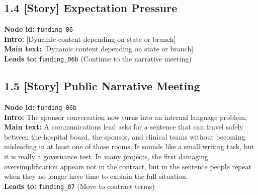 \documentclass[11pt]{article}
\begin{document}
\subsection*{1.4 [Story] Expectation Pressure}
\textbf{Node id:} \texttt{funding\_06}\\
\textbf{Intro:} [Dynamic content depending on state or branch]\\
\textbf{Main text:} [Dynamic content depending on state or branch]\\
\textbf{Leads to:} \texttt{funding\_06b} (Continue to the narrative meeting)\\
\subsection*{1.5 [Story] Public Narrative Meeting}
\textbf{Node id:} \texttt{funding\_06b}\\
\textbf{Intro:} The sponsor conversation now turns into an internal language problem.\\
\textbf{Main text:} A communications lead asks for a sentence that can travel safely between the hospital board, the sponsor, and clinical teams without becoming misleading in at least one of those rooms. It sounds like a small writing task, but it is really a governance test. In many projects, the first damaging oversimplification appears not in the contract, but in the sentence people repeat when they no longer have time to explain the full situation.\\
\textbf{Leads to:} \texttt{funding\_07} (Move to contract terms)\\
\end{document}
